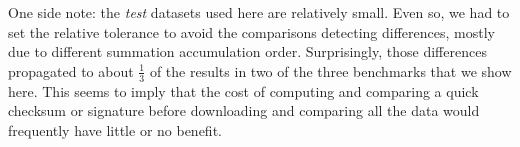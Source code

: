One side note: the \emph{test} datasets used here are relatively small.
Even so, we had to set the relative tolerance to avoid the comparisons detecting differences, mostly due to different summation accumulation order.
Surprisingly, those differences propagated to about $\frac{1}{3}$ of the results in two of the three benchmarks that we show here.
This seems to imply that the cost of computing and comparing a quick checksum or signature before downloading and comparing all the data would frequently have little or no benefit.
